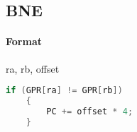 \subsection{BNE}


\paragraph{Format} ra, rb, offset

\begin{lstlisting}[language=c]
    if (GPR[ra] != GPR[rb])
    {
        PC += offset * 4;
    }
\end{lstlisting}

